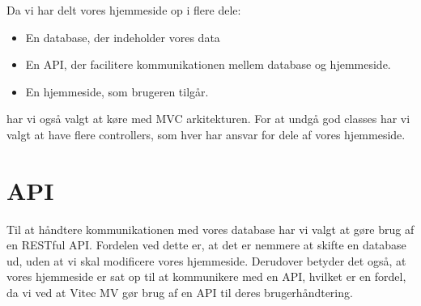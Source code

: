 \documentclass[a4paper]{article}
\begin{document}
Da vi har delt vores hjemmeside op i flere dele:
\begin{itemize}
    \item En database, der indeholder vores data
    \item En API, der facilitere kommunikationen mellem database og hjemmeside.
    \item En hjemmeside, som brugeren tilgår.
\end{itemize}

har vi også valgt at køre med MVC arkitekturen.
For at undgå god classes har vi valgt at have flere controllers, som hver har ansvar for dele af vores hjemmeside.

\section{API}

Til at håndtere kommunikationen med vores database har vi valgt at gøre brug af en RESTful API.
Fordelen ved dette er, at det er nemmere at skifte en database ud, uden at vi skal modificere vores hjemmeside.
Derudover betyder det også, at vores hjemmeside er sat op til at kommunikere med en API, hvilket er en fordel, da vi ved at Vitec MV gør brug af en API til deres brugerhåndtering.
\end{document}
